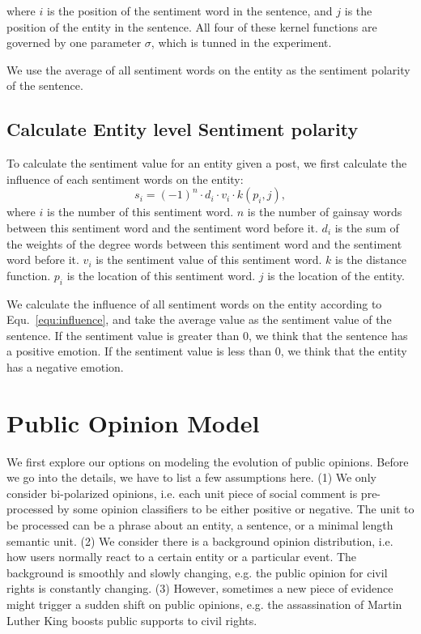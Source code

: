 \documentclass[runningheads]{llncs}
\begin{document}
where $i$ is the position of the sentiment word in the sentence, and $j$ is the position of the entity in the sentence. All four of these kernel functions are governed by one parameter $\sigma$, which is tunned in the experiment.

We use the average of all sentiment words on the entity as the sentiment polarity of the sentence.

\subsection{Calculate Entity level Sentiment polarity}
To calculate the sentiment value for an entity given a post, we first calculate the influence of each sentiment words on the entity:
\begin{equation}\label{equ:influence}
    s_i = (-1)^n\cdot d_i\cdot v_i\cdot k(p_i,j),
\end{equation}
where $i$ is the number of this sentiment word. $n$ is the number of gainsay words between this sentiment word and the sentiment word before it. $d_i$ is the sum of the weights of the degree words between this sentiment word and the sentiment word before it. $v_i$ is the sentiment value of this sentiment word. $k$ is the distance function. $p_i$ is the location of this sentiment word. $j$ is the location of the entity.%

We calculate the influence of all sentiment words on the entity according to Equ.~\ref{equ:influence}, and take the average value as the sentiment value of the sentence. If the sentiment value is greater than 0, we think that the sentence has a positive emotion. If the sentiment value is less than 0, we think that the entity has a negative emotion.



\section{Public Opinion Model}\label{sec:public opinion model}

We first explore our options on modeling the evolution of public opinions. Before we go into the details, we have to list a few assumptions here. (1) We only consider bi-polarized opinions, i.e. each unit piece of social comment is pre-processed by some opinion classifiers to be either positive or negative. The unit to be processed can be a phrase about an entity, a sentence, or a minimal length semantic unit. (2) We consider there is a background opinion distribution, i.e. how users normally react to a certain entity or a particular event. The background is smoothly and slowly changing, e.g. the public opinion for civil rights is constantly changing. (3) However, sometimes a new piece of evidence might trigger a sudden shift on public opinions, e.g. the assassination of Martin Luther King boosts public supports to civil rights.  
\end{document}
